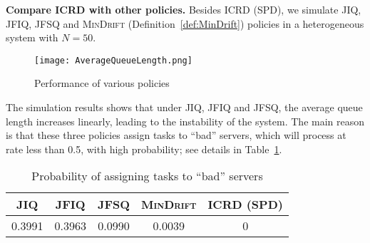 \documentclass[11pt, reqno]{article}
\numberwithin{equation}{section}
\numberwithin{theorem}{section}
\begin{document}
\noindent
\textbf{Compare ICRD with other policies.} Besides ICRD (SPD), we simulate JIQ, JFIQ, JFSQ and \textsc{MinDrift} (Definition~\ref{def:MinDrift}) policies in a heterogeneous system with $N=50$.
\begin{figure}[h]
    \centering
    \texttt{[image: AverageQueueLength.png]}
    \caption{Performance of various policies}
    \label{fig:my_label}
\end{figure}
The simulation results shows that under JIQ, JFIQ and JFSQ, the average queue length increases linearly, leading to the instability of the system. The main reason is that these three policies assign tasks to ``bad'' servers, which will process at rate less than 0.5, with high probability; see details in Table~\ref{table:prob-bad-server}.
\begin{table}[h]
\centering
\begin{tabular}{ |c|c|c|c|c| } 
 \hline
 JIQ & JFIQ & JFSQ & \textsc{MinDrift} & ICRD (SPD) \\ 
 \hline
  0.3991 & 0.3963 & 0.0990 & 0.0039 & 0 \\ 
 \hline
\end{tabular}
\caption{Probability of assigning tasks to ``bad'' servers}
\label{table:prob-bad-server}
\end{table}
\end{document}
